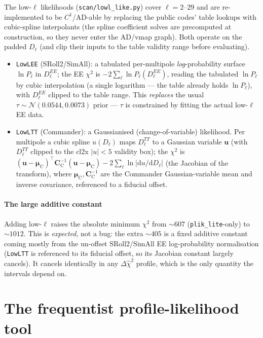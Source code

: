 \documentclass[11pt]{article}
\newcommand{\code}[1]{\texttt{\small #1}}
\newcommand{\file}[1]{\texttt{\small #1}}
\newcommand{\Dl}{D_\ell}
\newcommand{\chisq}{\chi^2}
\newcommand{\dchisq}{\Delta\hat\chi^2}
\begin{document}
The low-$\ell$ likelihoods (\file{scan/lowl\_like.py}) cover $\ell=2$--$29$
and are re-implemented to be $C^1$/AD-able by replacing the public codes'
table lookups with cubic-spline interpolants (the spline coefficient
solves are precomputed at construction, so they never enter the AD/vmap
graph). Both operate on the padded $\Dl$ (and clip their inputs to the
table validity range before evaluating).
\begin{itemize}[leftmargin=1.5em,itemsep=2pt]
\item \code{LowLEE} (SRoll2/SimAll): a tabulated per-multipole
\emph{log}-probability surface $\ln P_\ell$ in $\Dl^{EE}$; the EE $\chisq$
is $-2\sum_\ell\ln P_\ell(\Dl^{EE})$, reading the tabulated $\ln P_\ell$ by
cubic interpolation (a single logarithm --- the table already holds
$\ln P_\ell$), with
$\Dl^{EE}$ clipped to the table range. This \emph{replaces} the usual
$\tau\sim\mathcal N(0.0544,0.0073)$ prior --- $\tau$ is constrained by
fitting the actual low-$\ell$ EE data.
\item \code{LowLTT} (Commander): a Gaussianised (change-of-variable)
likelihood. Per multipole a cubic spline $u(\Dl)$ maps $\Dl^{TT}$ to a
Gaussian variable $\bm u$ (with $\Dl^{TT}$ clipped to the cl2x $|u|<5$
validity box); the $\chisq$ is
$(\bm u-\bm\mu_{\mathrm{C}})^\top\bm C^{-1}_{\mathrm{C}}(\bm u-\bm\mu_{\mathrm{C}})-2\sum_\ell\ln|\mathrm
du/\mathrm d\Dl|$ (the Jacobian of the transform), where
$\bm\mu_{\mathrm{C}},\bm C^{-1}_{\mathrm{C}}$ are the Commander
Gaussian-variable mean and inverse covariance, referenced to a fiducial
offset.
\end{itemize}
\paragraph{The large additive constant}
Adding low-$\ell$ raises the absolute minimum $\chisq$ from $\sim607$
(\code{plik\_lite}-only) to $\sim1012$. This is \emph{expected}, not a
bug: the extra $\sim405$ is a fixed additive constant coming mostly from
the un-offset SRoll2/SimAll EE log-probability normalisation (\code{LowLTT}
is referenced to its fiducial offset, so its Jacobian constant largely
cancels). It cancels identically in any $\dchisq$ profile, which is the
only quantity the intervals depend on.

\section{The frequentist profile-likelihood tool}
\label{sec:profile}
\end{document}

